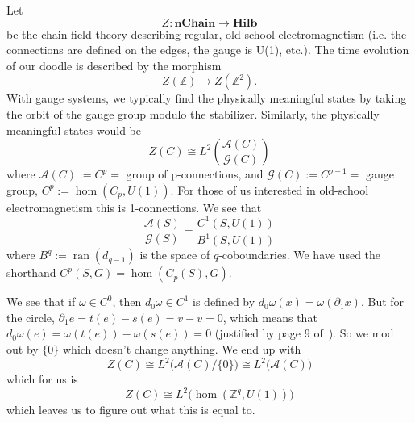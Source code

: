 \documentclass{amsart}
\numberwithin{equation}{section}
\begin{document}
Let 
\begin{equation}%
Z:\mathbf{nChain}\to\mathbf{Hilb}
\end{equation}
be the chain field theory describing regular, old-school
electromagnetism (i.e. the connections are defined on the edges,
the gauge is U(1), etc.). The time evolution of our doodle is
described by the morphism
\begin{equation}%
Z(\mathbb{Z})\to Z(\mathbb{Z}^{2}).
\end{equation}
With gauge systems, we typically find the physically meaningful
states by taking the orbit of the gauge group modulo the
stabilizer. Similarly, the physically meaningful states would be
\begin{equation}%
Z(C)\cong L^{2}\left(\frac{\mathcal{A}(C)}{\mathcal{G}(C)}\right)
\end{equation}
where $\mathcal{A}(C):=C^{p}=$ group of p-connections, and
$\mathcal{G}(C):=C^{p-1}=$ gauge group,
$C^{p}:=\hom(C_{p},U(1))$. For those of us interested in
old-school electromagnetism this is 1-connections. We see that
\begin{equation}%
\frac{\mathcal{A}(S)}{\mathcal{G}(S)} =
\frac{C^{1}(S,U(1))}{B^{1}(S,U(1))}
\end{equation}
where $B^{q}:=\operatorname{ran}(d_{q-1})$ is the space of
$q$-coboundaries. We have used the shorthand $C^{p}(S,G)=\hom(C_{p}(S),G)$.

We see that if $\omega\in C^{0}$, then $d_{0}\omega\in C^{1}$ is
defined by $d_{0}\omega(x)=\omega(\partial_{1}x)$. But for the
circle, $\partial_{1}e=t(e)-s(e)=v-v=0$, which means that
$d_{0}\omega(e)=\omega(t(e))-\omega(s(e))=0$ (justified by page 9
of~\cite{Wise:2006kg}). So we mod out by $\{0\}$ which doesn't
change anything. We end up with
\begin{equation}%
Z(C)\cong L^{2}\Big(\mathcal{A}(C)/\{0\}\Big)\cong L^{2}\Big(\mathcal{A}(C)\Big)
\end{equation}
which for us is 
\begin{equation}%
Z(C)\cong L^{2}\Big(\hom(\mathbb{Z}^{q},U(1))\Big)
\end{equation}
which leaves us to figure out what this is equal to.
\end{document}
